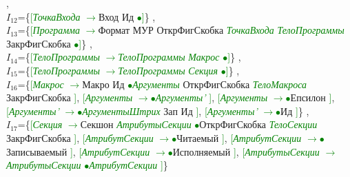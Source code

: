 \documentclass[a0]{a0poster}
\begin{document}
,\\
$I_{12}$=\{\textcolor{Green}{[}\textcolor{Green}{\textit{ТочкаВхода}} \textcolor{Green}{$\to$}Вход Ид \textcolor{Green}{$\bullet$}\textcolor{Green}{]}\}
,\\
$I_{13}$=\{\textcolor{Green}{[}\textcolor{Green}{\textit{Программа}} \textcolor{Green}{$\to$}Формат МУР ОткрФигСкобка \textcolor{Green}{\textit{ТочкаВхода}} \textcolor{Green}{\textit{ТелоПрограммы}} ЗакрФигСкобка \textcolor{Green}{$\bullet$}\textcolor{Green}{]}\}
,\\
$I_{14}$=\{\textcolor{Green}{[}\textcolor{Green}{\textit{ТелоПрограммы}} \textcolor{Green}{$\to$}\textcolor{Green}{\textit{ТелоПрограммы}} \textcolor{Green}{\textit{Макрос}} \textcolor{Green}{$\bullet$}\textcolor{Green}{]}\}
,\\
$I_{15}$=\{\textcolor{Green}{[}\textcolor{Green}{\textit{ТелоПрограммы}} \textcolor{Green}{$\to$}\textcolor{Green}{\textit{ТелоПрограммы}} \textcolor{Green}{\textit{Секция}} \textcolor{Green}{$\bullet$}\textcolor{Green}{]}\}
,\\
$I_{16}$=\{\textcolor{Green}{[}\textcolor{Green}{\textit{Макрос}} \textcolor{Green}{$\to$}Макро Ид \textcolor{Green}{$\bullet$}\textcolor{Green}{\textit{Аргументы}} ОткрФигСкобка \textcolor{Green}{\textit{ТелоМакроса}} ЗакрФигСкобка \textcolor{Green}{]}, \textcolor{Green}{[}\textcolor{Green}{\textit{Аргументы}} \textcolor{Green}{$\to$}\textcolor{Green}{$\bullet$}\textcolor{Green}{\textit{Аргументы'}} \textcolor{Green}{]}, \textcolor{Green}{[}\textcolor{Green}{\textit{Аргументы}} \textcolor{Green}{$\to$}\textcolor{Green}{$\bullet$}Епсилон \textcolor{Green}{]}, \textcolor{Green}{[}\textcolor{Green}{\textit{Аргументы'}} \textcolor{Green}{$\to$}\textcolor{Green}{$\bullet$}\textcolor{Green}{\textit{АргументыШтрих}} Зап Ид \textcolor{Green}{]}, \textcolor{Green}{[}\textcolor{Green}{\textit{Аргументы'}} \textcolor{Green}{$\to$}\textcolor{Green}{$\bullet$}Ид \textcolor{Green}{]}\}
,\\
$I_{17}$=\{\textcolor{Green}{[}\textcolor{Green}{\textit{Секция}} \textcolor{Green}{$\to$}Секшон \textcolor{Green}{\textit{АтрибутыСекции}} \textcolor{Green}{$\bullet$}ОткрФигСкобка \textcolor{Green}{\textit{ТелоСекции}} ЗакрФигСкобка \textcolor{Green}{]}, \textcolor{Green}{[}\textcolor{Green}{\textit{АтрибутСекции}} \textcolor{Green}{$\to$}\textcolor{Green}{$\bullet$}Читаемый \textcolor{Green}{]}, \textcolor{Green}{[}\textcolor{Green}{\textit{АтрибутСекции}} \textcolor{Green}{$\to$}\textcolor{Green}{$\bullet$}Записываемый \textcolor{Green}{]}, \textcolor{Green}{[}\textcolor{Green}{\textit{АтрибутСекции}} \textcolor{Green}{$\to$}\textcolor{Green}{$\bullet$}Исполняемый \textcolor{Green}{]}, \textcolor{Green}{[}\textcolor{Green}{\textit{АтрибутыСекции}} \textcolor{Green}{$\to$}\textcolor{Green}{\textit{АтрибутыСекции}} \textcolor{Green}{$\bullet$}\textcolor{Green}{\textit{АтрибутСекции}} \textcolor{Green}{]}\}
\end{document}
